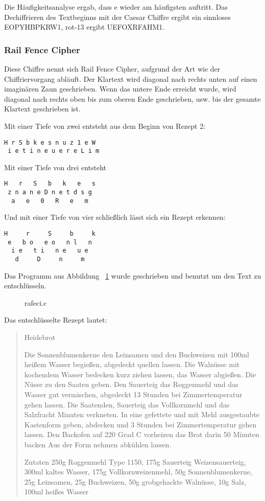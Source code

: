 Die Häufigkeitsanalyse ergab, dass \glqq{}e\grqq{} wieder am häufigsten auftritt. Das
Dechiffrieren des Textbeginns mit der Caesar Chiffre ergibt ein sinnloses
\glqq{}EOPYHBPKRW1\grqq{}, rot-13 ergibt \glqq{}UEFOXRFAHM1\grqq{}.

\subsubsection*{Rail Fence Cipher}

Diese Chiffre nennt sich Rail Fence Cipher, aufgrund der Art wie der
Chiffriervorgang abläuft. Der Klartext wird diagonal nach rechts unten auf einen
imaginären Zaun geschrieben. Wenn das untere Ende erreicht wurde, wird diagonal
nach rechts oben bis zum oberen Ende geschrieben, usw. bis der gesamte Klartext
geschrieben ist.

Mit einer Tiefe von zwei entsteht aus dem Beginn von Rezept 2:

\begin{lstlisting}
H r S b k e s n u z 1 e W
 i e t i n e u e r e L i m
\end{lstlisting}

Mit einer Tiefe von drei entsteht

\begin{lstlisting}
H   r   S   b   k   e   s
 z n a n e D n e t d s g
  a   e   0   R   e   m
\end{lstlisting}
Und mit einer Tiefe von vier schließlich lässt sich ein Rezept erkennen:
\begin{lstlisting}
H     r     S     b     k
 e   b o   e o   n l   n
  i e   t i   n e   u e
   d     D     n     m
\end{lstlisting}

Das Programm aus Abbildung ~\ref{fig:rafeci} wurde geschrieben und benutzt um den Text zu
entschlüsseln.

\begin{figure}[p]

\caption{rafeci.c}
\label{fig:rafeci}
\end{figure}

Das entschlüsselte Rezept lautet:

\begin{quote}
Heidebrot

Die Sonnenblumenkerne den Leinsamen und den Buchweizen mit 100ml heißem Wasser begießen, abgedeckt quellen lassen.
Die Walnüsse mit kochendem Wasser bedecken kurz ziehen lassen, das Wasser abgießen. Die Nüsse zu den Saaten geben.
Den Sauerteig das Roggenmehl und das Wasser gut vermischen, abgedeckt 13 Stunden bei Zimmertemperatur gehen lassen.
Die Saatenden, Sauerteig das Vollkornmehl und das Salzfracht Minuten verkneten. In eine gefettete und mit Mehl
ausgestaubte Kastenform geben, abdecken und 3 Stunden bei Zimmertemperatur gehen lassen. Den Backofen auf 220 Grad C vorheizen
das Brot darin 50 Minuten backen Aus der Form nehmen abkühlen lassen.

Zutaten
250g Roggenmehl Type 1150, 175g Sauerteig Weizensauerteig, 300ml kaltes Wasser, 175g Vollkornweizenmehl, 50g
Sonnenblumenkerne, 25g Leinsamen, 25g Buchweizen, 50g grobgehackte Walnüsse, 10g Salz, 100ml heißes Wasser
\end{quote}
